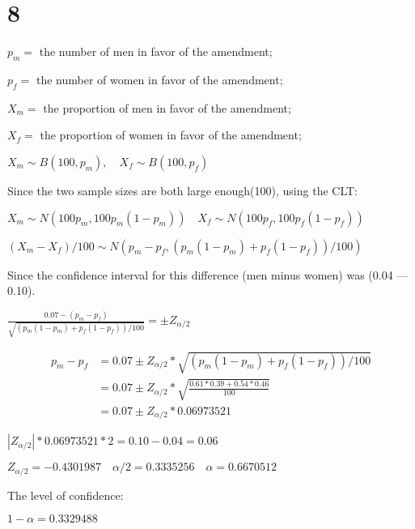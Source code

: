 \documentclass{article}
\begin{document}
\section*{8}\noindent


$p_m=$ the number of men in favor of the amendment;

$p_f=$ the number of women in favor of the amendment;

$X_m=$ the proportion of men in favor of the amendment;

$X_f=$ the proportion of women in favor of the amendment;

$X_m\sim B(100,p_m),\quad X_f\sim B(100,p_f)$ 

Since the two sample sizes are both large enough(100), using the CLT:

$X_m\sim N(100p_m,100p_m(1-p_m))\quad X_f\sim N(100p_f,100p_f(1-p_f))$

$(X_m-X_f)/100\sim N(p_m-p_f,(p_m(1-p_m)+p_f(1-p_f))/100)$


Since the confidence interval for this difference (men minus women) was (0.04 — 0.10).

$\frac{0.07-(p_m-p_f)}{\sqrt{(p_m(1-p_m)+p_f(1-p_f))/100}}=\pm Z_{\alpha/2}$

\begin{equation*}
	\begin{split}
		p_m-p_f&=0.07\pm Z_{\alpha/2}*\sqrt{(p_m(1-p_m)+p_f(1-p_f))/100}\\
		&=0.07\pm Z_{\alpha/2}*\sqrt{\frac{0.61*0.39+0.54*0.46}{100}}\\
		&=0.07\pm Z_{\alpha/2}*0.06973521
	\end{split}
\end{equation*}

$|Z_{\alpha/2}|*0.06973521*2=0.10-0.04=0.06$

$Z_{\alpha/2}=-0.4301987\quad	 \alpha/2=0.3335256\quad \alpha=0.6670512$

The level of confidence:

$1-\alpha=0.3329488$
\end{document}
